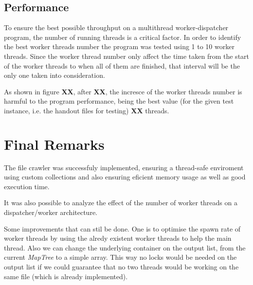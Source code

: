 \documentclass[twocolumn,20pt]{article}
\begin{document}
\subsection{Performance}
To ensure the best possible throughput on a multithread worker-dispatcher program, the number of running threads is a critical factor. In order to identify the best worker threads number the program was tested using 1 to 10 worker threads. Since the worker thread number only affect the time taken from the start of the worker threads to when all of them are finished, that interval will be the only one taken into consideration.

As shown in figure \textbf{XX}, after \textbf{XX}, the incresce of the worker threads number is harmful to the program performance, being the best value (for the given test instance, i.e. the handout files for testing) \textbf{XX} threads.

\section{Final Remarks}
The file crawler was successfuly implemented, ensuring a thread-safe enviroment using custom collections and also ensuring eficient memory usage as well as good execution time.

It was also possible to analyze the effect of the number of worker threads on a dispatcher/worker architecture.

Some improvements that can stil be done. One is to optimise the spawn rate of worker threads by using the alredy existent worker threads to help the main thread. Also we can change the underlying container on the output list, from the current \textit{MapTree} to a simple array. This way no locks would be needed on the output list if we could guarantee that no two threads would be working on the same file (which is already implemented).
\end{document}
